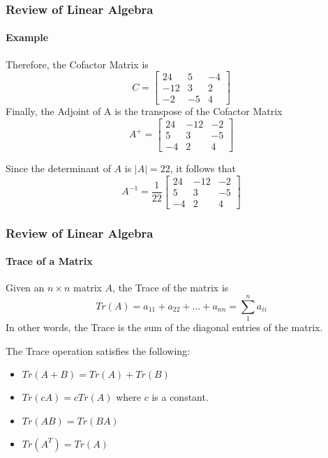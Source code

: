\begin{frame}
\frametitle{Review of Linear Algebra}
\framesubtitle{Example}
\begin{examp}
Therefore, the {\bor Cofactor Matrix} is
$$
C = \left[\begin{array}{rrr}
24 & 5 & -4 \\ -12 & 3 & 2 \\ -2 & -5 & 4 \end{array}\right]
$$
Finally, the {\bor Adjoint of A} is the transpose of the Cofactor Matrix
$$
A^+ = \left[\begin{array}{rrr}
24 & -12 & -2 \\ 5 & 3 & -5 \\ -4 & 2 & 4 \end{array}\right]
$$
\end{examp}
Since the determinant of $A$ is $|A| = 22$, it follows that
$$
A^{-1} = \frac{1}{22} \left[\begin{array}{rrr}
24 & -12 & -2 \\ 5 & 3 & -5 \\ -4 & 2 & 4 \end{array}\right]
$$
\end{frame}
\begin{frame}
\frametitle{Review of Linear Algebra}
\framesubtitle{Trace of a Matrix}
\begin{definition}
Given an $n\times n$ matrix $A$, the {\bor Trace} of the matrix is
$$
Tr(A) = a_{11} + a_{22} + \dots + a_{nn} = \sum_1^n a_{ii}
$$
In other words, the Trace is the {\bor sum of the diagonal entries of the matrix}.
\end{definition}
The Trace operation satisfies the following:
\begin{itemize}
\item
$Tr(A+B) = Tr(A) + Tr(B)$
\item
$Tr(cA) = cTr(A)$ where $c$ is a constant.
\item
$Tr(AB) = Tr(BA)$
\item
$Tr(A^T)=Tr(A)$
\end{itemize}
\end{frame}

